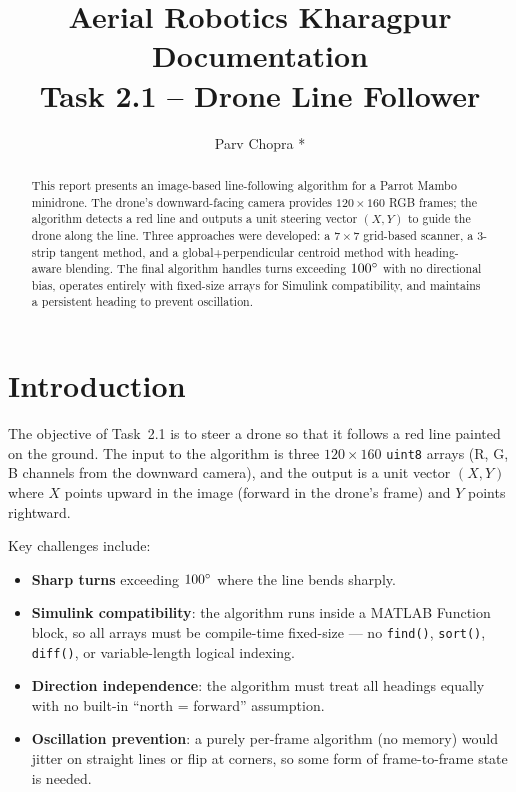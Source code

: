 \documentclass[conference, twocolumn]{IEEEtran}
\title{Aerial Robotics Kharagpur Documentation\\Task 2.1 -- Drone Line Follower}
\author{Parv Chopra *}
\begin{document}
\maketitle

\begin{abstract}
This report presents an image-based line-following algorithm for a Parrot Mambo minidrone. The drone's downward-facing camera provides $120\times160$ RGB frames; the algorithm detects a red line and outputs a unit steering vector $(X, Y)$ to guide the drone along the line. Three approaches were developed: a $7\times7$ grid-based scanner, a 3-strip tangent method, and a global+perpendicular centroid method with heading-aware blending. The final algorithm handles turns exceeding $100\degree$ with no directional bias, operates entirely with fixed-size arrays for Simulink compatibility, and maintains a persistent heading to prevent oscillation.
\end{abstract}

\section{Introduction}

The objective of Task~2.1 is to steer a drone so that it follows a red line painted on the ground. The input to the algorithm is three $120\times160$ \texttt{uint8} arrays (R, G, B channels from the downward camera), and the output is a unit vector $(X, Y)$ where $X$ points upward in the image (forward in the drone's frame) and $Y$ points rightward.

Key challenges include:
\begin{itemize}
    \item \textbf{Sharp turns} exceeding $100\degree$ where the line bends sharply.
    \item \textbf{Simulink compatibility}: the algorithm runs inside a MATLAB Function block, so all arrays must be compile-time fixed-size --- no \texttt{find()}, \texttt{sort()}, \texttt{diff()}, or variable-length logical indexing.
    \item \textbf{Direction independence}: the algorithm must treat all headings equally with no built-in ``north = forward'' assumption.
    \item \textbf{Oscillation prevention}: a purely per-frame algorithm (no memory) would jitter on straight lines or flip at corners, so some form of frame-to-frame state is needed.
\end{itemize}
\end{document}
